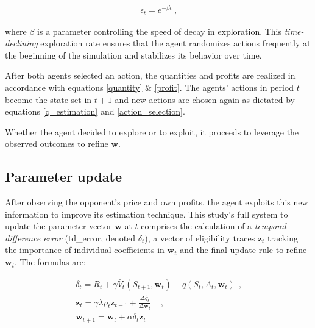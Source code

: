 \begin{gather}
	\epsilon_t = e^{-\beta t}~ \text{,}
\end{gather}

where $\beta$ is a parameter controlling the speed of decay in exploration. This \emph{time-declining} exploration rate ensures that the agent randomizes actions frequently at the beginning of the simulation and stabilizes its behavior over time. 

After both agents selected an action, the quantities and profits are realized in accordance with equations \ref{quantity} \& \ref{profit}. The agents' actions in period $t$ become the state set in $t+1$ and new actions are chosen again as dictated by equations \ref{q_estimation} and \ref{action_selection}.

Whether the agent decided to explore or to exploit, it proceeds to leverage the observed outcomes to refine $\boldsymbol{w}$.

\subsection{Parameter update}\label{parameter_update}

After observing the opponent's price and own profits, the agent exploits this new information to improve its estimation technique. This study's full system to update the parameter vector $\boldsymbol{w}$ at $t$ comprises the calculation of a \emph{temporal-difference error} (\gls{td_error}, denoted $\delta_t$), a vector of eligibility traces $\boldsymbol{z}_t$ tracking the importance of individual coefficients in $\boldsymbol{w}_t$ and the final update rule to refine $\boldsymbol{w}_t$. The formulas are:

\begin{gather}
\delta_t = R_t + \gamma \bar{V}_t(S_{t+1}, \boldsymbol{w}_t) - \hat{q}(S_t, A_t, \boldsymbol{w}_t) ~~ \text{,} \label{td_error_expected} \\
\boldsymbol{z}_{t} = 
\gamma \lambda \rho_t \boldsymbol{z}_{t-1} + \frac{\Delta \hat{q}_t}{\Delta \boldsymbol{w}_t} ~~~~~ \text{,} \label{eligibility_trace_update} \\
\boldsymbol{w}_{t+1} = \boldsymbol{w}_t + \alpha \delta_t	\boldsymbol{z}_t \label{update_rule}
\end{gather}


